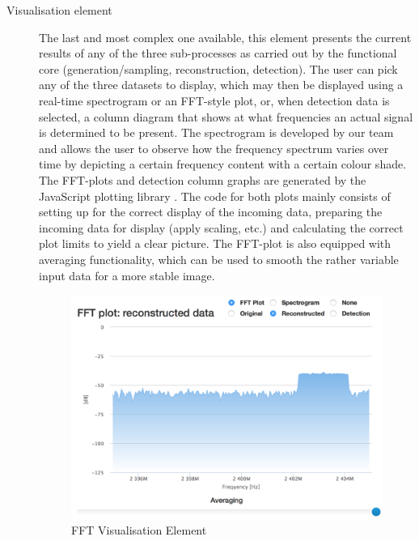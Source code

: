 \documentclass[a4paper, openany, oneside]{memoir}
\begin{document}
\begin{description}
	\item[Visualisation element]
        The last and most complex one available, this element presents the current results of any of the three sub-processes as carried out by the functional core (generation/sampling, reconstruction, detection). The user can pick any of the three datasets to display, which may then be displayed using a real-time spectrogram or an FFT-style plot, or, when detection data is selected, a column diagram that shows at what frequencies an actual signal is determined to be present.
        The spectrogram is developed by our team and allows the user to observe how the frequency spectrum varies over time by depicting a certain frequency content with a certain colour shade.
    The FFT-plots and detection column graphs are generated by the JavaScript plotting library . The code for both plots mainly consists of setting up  for the correct display of the incoming data, preparing the incoming data for display (apply scaling, etc.) and calculating the correct plot limits to yield a clear picture.
	The FFT-plot is also equipped with averaging functionality, which can be used to smooth the rather variable input data for a more stable image.

\begin{figure}[H]
    \centering
    \includegraphics[width=\textwidth]{figures/fft.png}
    \caption{FFT Visualisation Element}
    \label{fig:fft_element}
\end{figure}


\end{description}
\end{document}
